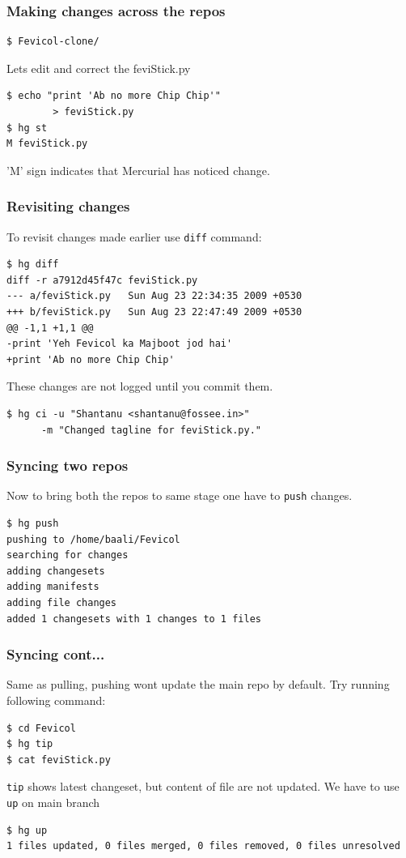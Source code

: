 \documentclass[14pt,compress]{beamer}
\newcounter{time}
\newcommand{\inctime}[1]{\addtocounter{time}{#1}{\tiny \thetime\ m}}
\newcommand{\typ}[1]{\lstinline{#1}}
\begin{document}
\begin{frame}[fragile]
  \frametitle{Making changes across the repos}
  \begin{lstlisting}
$ Fevicol-clone/
  \end{lstlisting} %
  Lets edit and correct the feviStick.py 
\begin{lstlisting}
$ echo "print 'Ab no more Chip Chip'" 
        > feviStick.py
$ hg st
M feviStick.py
\end{lstlisting}
  'M' sign indicates that Mercurial has noticed change.\\
\end{frame}

\begin{frame}[fragile]
  \frametitle{Revisiting changes}
To revisit changes made earlier use \typ{diff} command:
\begin{lstlisting}
$ hg diff
diff -r a7912d45f47c feviStick.py
--- a/feviStick.py   Sun Aug 23 22:34:35 2009 +0530
+++ b/feviStick.py   Sun Aug 23 22:47:49 2009 +0530
@@ -1,1 +1,1 @@
-print 'Yeh Fevicol ka Majboot jod hai'
+print 'Ab no more Chip Chip'
  \end{lstlisting} %
  These changes are not logged until you commit them.\\
  \begin{lstlisting}
$ hg ci -u "Shantanu <shantanu@fossee.in>" 
      -m "Changed tagline for feviStick.py."
  \end{lstlisting} %
\end{frame}

\begin{frame}[fragile]
  \frametitle{Syncing two repos}
  Now to bring both the repos to same stage one have to \typ{push} changes.
  \begin{lstlisting}
$ hg push 
pushing to /home/baali/Fevicol
searching for changes
adding changesets
adding manifests
adding file changes
added 1 changesets with 1 changes to 1 files
  \end{lstlisting} %
\end{frame}


\begin{frame}[fragile]
  \frametitle{Syncing cont...}
  Same as pulling, pushing wont update the main repo by default. Try running following command:
  \begin{lstlisting}
$ cd Fevicol
$ hg tip    
$ cat feviStick.py
  \end{lstlisting}
  \typ{tip} shows latest changeset, but content of file are not updated. We have to use \typ{up} on main branch
  \begin{lstlisting}
$ hg up
1 files updated, 0 files merged, 0 files removed, 0 files unresolved    
  \end{lstlisting} %
  \inctime{15}
\end{frame}
\end{document}
